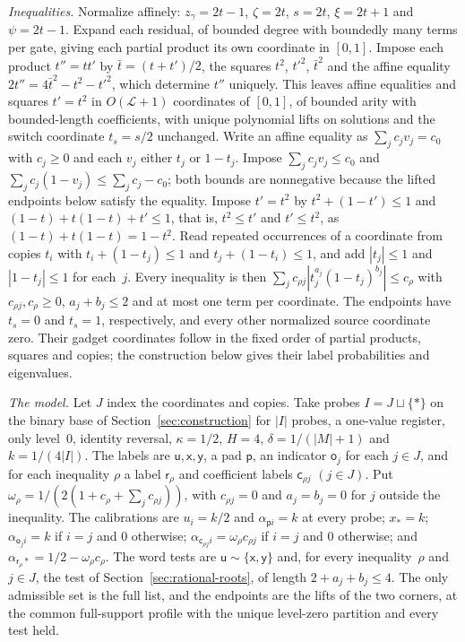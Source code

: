 \emph{Inequalities.} Normalize affinely: $z_\gamma=2t-1$, $\zeta=2t$,
$s=2t$, $\xi=2t+1$ and $\psi=2t-1$. Expand each residual, of bounded
degree with boundedly many terms per gate, giving each partial product its
own coordinate in $[0,1]$. Impose each product $t''=tt'$ by
$\bar t=(t+t')/2$, the squares $t^2$, $t'^2$, $\bar t^2$ and the affine
equality $2t''=4\bar t^2-t^2-t'^2$, which determine $t''$ uniquely. This
leaves affine equalities and squares $t'=t^2$ in $O(\mathcal L+1)$ coordinates of
$[0,1]$, of bounded arity with bounded-length coefficients, with unique
polynomial lifts on solutions and the switch coordinate $t_s=s/2$
unchanged. Write an affine equality as $\sum_jc_jv_j=c_0$ with $c_j\ge0$
and each $v_j$ either $t_j$ or $1-t_j$. Impose $\sum_jc_jv_j\le c_0$
and $\sum_jc_j(1-v_j)\le\sum_jc_j-c_0$; both bounds are nonnegative because
the lifted endpoints below satisfy the equality. Impose $t'=t^2$ by
$t^2+(1-t')\le1$ and $(1-t)+t(1-t)+t'\le1$, that is, $t^2\le t'$ and
$t'\le t^2$, as $(1-t)+t(1-t)=1-t^2$. Read repeated occurrences of a
coordinate from copies $t_i$ with $t_i+(1-t_j)\le1$ and
$t_j+(1-t_i)\le1$, and add $|t_j|\le1$ and $|1-t_j|\le1$ for each~$j$.
Every inequality is then
$\sum_jc_{\rho j}|t_j^{a_j}(1-t_j)^{b_j}|\le c_\rho$ with
$c_{\rho j},c_\rho\ge0$, $a_j+b_j\le2$ and at most one term per coordinate.
The endpoints have $t_s=0$ and $t_s=1$, respectively, and every other
normalized source coordinate zero. Their gadget coordinates follow in the
fixed order of partial products, squares and copies; the construction below
gives their label probabilities and eigenvalues.

\emph{The model.} Let $J$ index the coordinates and copies. Take probes
$I=J\sqcup\{\ast\}$ on the binary base of Section~\ref{sec:construction}
for $|I|$ probes, a one-value register, only level~$0$, identity reversal,
$\kappa=1/2$, $H=4$, $\delta=1/(|M|+1)$ and $k=1/(4|I|)$. The labels are
$\mathsf u,\mathsf x,\mathsf y$, a pad $\mathsf p$, an indicator
$\mathsf o_j$ for each $j\in J$, and for each inequality $\rho$ a label
$\mathsf r_\rho$ and coefficient labels $\mathsf c_{\rho j}$ $(j\in J)$.
Put $\omega_\rho=1/(2(1+c_\rho+\sum_jc_{\rho j}))$, with $c_{\rho j}=0$ and
$a_j=b_j=0$ for $j$ outside the inequality. The calibrations are $u_i=k/2$
and $\alpha_{\mathsf pi}=k$ at every probe; $x_\ast=k$;
$\alpha_{\mathsf o_ji}=k$ if $i=j$ and $0$ otherwise;
$\alpha_{\mathsf c_{\rho j}i}=\omega_\rho c_{\rho j}$ if $i=j$ and $0$
otherwise; and $\alpha_{\mathsf r_\rho\ast}=1/2-\omega_\rho c_\rho$. The
word tests are $\mathsf u\sim\{\mathsf x,\mathsf y\}$ and, for every
inequality~$\rho$ and $j\in J$, the test of
Section~\ref{sec:rational-roots}, of length $2+a_j+b_j\le4$. The only
admissible set is the full list, and the endpoints are the lifts of the two
corners, at the common full-support profile with the unique level-zero
partition and every test held.

